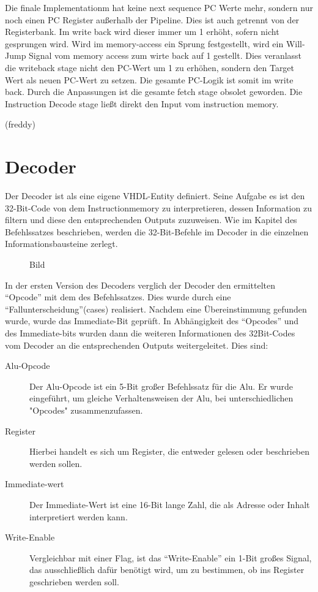 \documentclass[paper=a4,fontsize=12pt,twocolumn]{scrreprt}
\begin{document}
Die finale Implementationm hat keine next sequence PC Werte mehr, sondern nur noch einen PC Register außerhalb der Pipeline.
Dies ist auch getrennt von der Registerbank.
Im write back wird dieser immer um 1 erhöht, sofern nicht gesprungen wird.
Wird im memory-access ein Sprung festgestellt, wird ein Will-Jump Signal vom memory access zum wirte back auf 1 gestellt. Dies veranlasst die writeback stage nicht den PC-Wert um 1 zu erhöhen, sondern den Target Wert als neuen PC-Wert zu setzen. 
Die gesamte PC-Logik ist somit im write back.
Durch die Anpassungen ist die gesamte fetch stage obsolet geworden. Die  Instruction Decode stage ließt direkt den Input vom instruction memory. 

(freddy)

\section{Decoder}

Der Decoder ist als eine eigene VHDL-Entity definiert. Seine Aufgabe es ist den 32-Bit-Code von dem Instructionmemory zu interpretieren, dessen Information zu filtern und diese den entsprechenden Outputs zuzuweisen.
Wie im Kapitel des Befehlssatzes beschrieben, werden die 32-Bit-Befehle im Decoder in die einzelnen Informationsbausteine zerlegt.

\begin{figure}[h]
\centering
\caption{Bild}
\end{figure}

In der ersten Version des Decoders verglich der Decoder den ermittelten \enquote{Opcode} mit dem des Befehlssatzes.
Dies wurde durch eine \enquote{Fallunterscheidung}(cases) realisiert. Nachdem eine Übereinstimmung gefunden wurde, wurde das Immediate-Bit geprüft.
In Abhängigkeit des \enquote{Opcodes} und des Immediate-bits wurden dann die weiteren Informationen des 32Bit-Codes vom Decoder an die entsprechenden Outputs weitergeleitet. 
Dies sind:

\begin{description}
 \item [Alu-Opcode]
 Der Alu-Opcode ist ein 5-Bit großer Befehlssatz für die Alu.
 Er wurde eingeführt, um gleiche Verhaltensweisen der Alu, bei unterschiedlichen "Opcodes" zusammenzufassen.

\item [Register]
 Hierbei handelt es sich um Register, die entweder gelesen oder beschrieben werden sollen.

\item [Immediate-wert]
Der Immediate-Wert ist eine 16-Bit lange Zahl, die als Adresse oder Inhalt interpretiert werden kann.

\item [Write-Enable]
 Vergleichbar mit einer Flag, ist das \enquote{Write-Enable} ein 1-Bit großes Signal, das ausschließlich dafür benötigt wird, um zu bestimmen, ob ins Register geschrieben werden soll.
\end{description}
\end{document}
